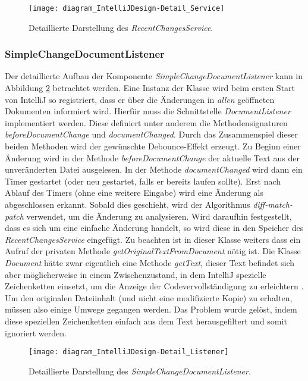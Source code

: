 \begin{figure}
    \centering
    \texttt{[image: diagram\_IntelliJDesign-Detail\_Service]}
    \caption{Detaillierte Darstellung des \emph{RecentChangesService}.}
    \label{fig:diagram_IntelliJDesign-Detail_Service}
\end{figure}

\subsubsection{SimpleChangeDocumentListener}

Der detaillierte Aufbau der Komponente \emph{SimpleChangeDocumentListener}
kann in Abbildung \ref{fig:diagram_IntelliJDesign-Detail_Listener} betrachtet werden.
Eine Instanz der Klasse wird beim ersten Start von IntelliJ so registriert, 
dass er über die Änderungen in \emph{allen} geöffneten Dokumenten informiert wird. 
Hierfür muss die Schnittstelle \emph{DocumentListener} implementiert werden.
Diese definiert unter anderem die Methodensignaturen \emph{beforeDocumentChange}
und \emph{documentChanged}. Durch das Zusammenspiel dieser beiden Methoden
wird der gewünschte Debounce-Effekt erzeugt. Zu Beginn einer Änderung
wird in der Methode \emph{beforeDocumentChange} der aktuelle Text aus der 
unveränderten Datei ausgelesen. In der Methode \emph{documentChanged} wird
dann ein Timer gestartet (oder neu gestartet, falls er bereits laufen sollte).
Erst nach Ablauf des Timers (ohne eine weitere Eingabe) wird
eine Änderung als abgeschlossen erkannt. Sobald dies geschieht, wird 
der Algorithmus \emph{diff-match-patch} verwendet, um die Änderung zu analysieren.
Wird daraufhin festgestellt, dass es sich um eine einfache Änderung handelt,
so wird diese in den Speicher des \emph{RecentChangesService} eingefügt.
Zu beachten ist in dieser Klasse weiters dass ein Aufruf der privaten Methode 
\emph{getOriginalTextFromDocument} nötig ist. 
Die Klasse \emph{Document} hätte zwar eigentlich
eine Methode \emph{getText}, dieser Text befindet sich aber möglicherweise
in einem Zwischenzustand, in dem IntelliJ spezielle Zeichenketten 
einsetzt, um die Anzeige der Codevervollständigung zu erleichtern
\cite{IntelliJTheDreadedString,IntelliJGitHubCompletionUtilCore}.
Um den originalen Dateiinhalt (und nicht eine modifizierte Kopie) zu erhalten,
müssen also einige Umwege gegangen werden. Das Problem wurde gelöst,
indem diese speziellen Zeichenketten einfach aus dem Text herausgefiltert
und somit ignoriert werden.

\begin{figure}
    \centering
    \texttt{[image: diagram\_IntelliJDesign-Detail\_Listener]}
    \caption{Detaillierte Darstellung des \emph{SimpleChangeDocumentListener}.}
    \label{fig:diagram_IntelliJDesign-Detail_Listener}
\end{figure}

